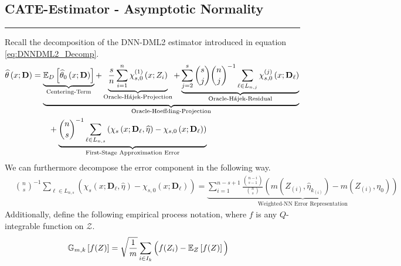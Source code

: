 \subsection{CATE-Estimator - Asymptotic Normality}
\hrule
Recall the decomposition of the DNN-DML2 estimator introduced in equation \ref{eq:DNNDML2_Decomp}.
\begin{equation}
    \begin{aligned}
        \widehat{\theta}\left(x; \mathbf{D}\right)
        & = \underbrace{\underbrace{\mathbb{E}_{D}\left[\widehat{\theta}_{0}\left(x; \mathbf{D}\right)\right]}_{\text{Centering-Term}}
        + \underbrace{\frac{s}{n}\sum_{i = 1}^{n} \chi_{s,0}^{(1)}\left(x; Z_{i}\right)}_{\text{Oracle-H\'ajek-Projection}}
        + \underbrace{\sum_{j = 2}^{s} \binom{s}{j} \binom{n}{j}^{-1}\sum_{\ell \in L_{n,j}} \chi_{s,0}^{(j)}\left(x; \mathbf{D}_{\ell}\right)}_{\text{Oracle-H\'ajek-Residual}}}_{\text{Oracle-Hoeffding-Projection}}\\
        & \quad \quad + \underbrace{\binom{n}{s}^{-1}\sum_{\ell \in L_{n,s}}\left(\chi_{s}\left(x; \mathbf{D}_{\ell}, \widehat{\eta}\right) - \chi_{s,0}\left(x; \mathbf{D}_{\ell}\right)\right)}_{\text{First-Stage Approximation Error}}
    \end{aligned}
\end{equation}
We can furthermore decompose the error component in the following way.
\begin{equation}
    \begin{aligned}
        & \binom{n}{s}^{-1} \sum_{\ell \in L_{n,s}}\left(\chi_{s}\left(x; \mathbf{D}_{\ell}, \hat{\eta}\right) - \chi_{s,0}\left(x; \mathbf{D}_{\ell}\right)\right)
        = \underbrace{\sum_{i = 1}^{n - s + 1} \frac{\binom{n-i}{s-1}}{\binom{n}{s}} \left(m(Z_{(i)}, \hat{\eta}_{k_{(i)}}) - m(Z_{(i)}, \eta_{0})\right)}_{\text{Weighted-NN Error Representation}}
    \end{aligned}
\end{equation}
Additionally, define the following empirical process notation, where $f$ is any $Q$-integrable function on $\mathcal{Z}$.
\begin{equation}
    \begin{aligned}
        \mathbb{G}_{m,k}\left[f(Z)\right]
        & = \sqrt{\frac{1}{m}} \sum_{i \in I_{k}} \Big(f(Z_i) - \mathbb{E}_{Z}\left[f(Z)\right]\Big)
    \end{aligned}
\end{equation}

